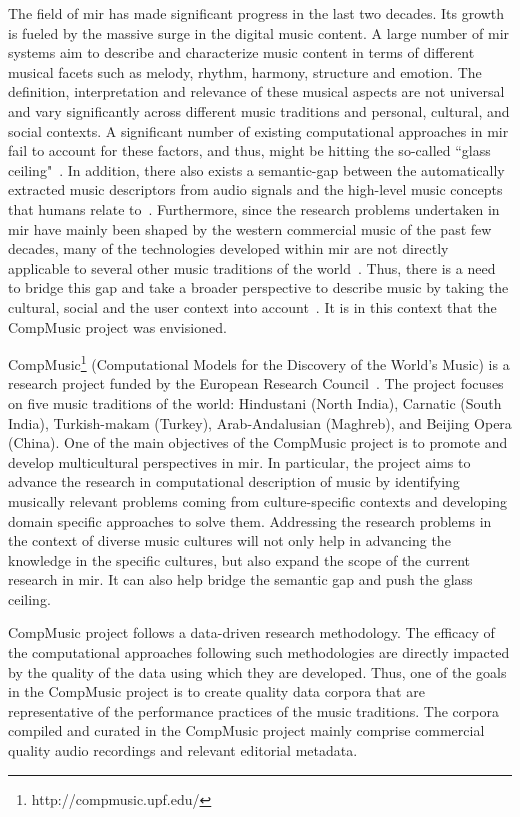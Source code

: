 The field of \gls{mir} has made significant progress in the last two decades. Its growth is fueled by the massive surge in the digital music content. A large number of \gls{mir} systems aim to describe and characterize music content in terms of different musical facets such as melody, rhythm, harmony, structure and emotion. The definition, interpretation and relevance of these musical aspects are not universal and vary significantly across different music traditions and personal, cultural, and social contexts. A significant number of existing computational approaches in \gls{mir} fail to account for these factors, and thus, might be hitting the so-called ``glass ceiling"~\citep{pachet2004improving,casey2008content}. In addition, there also exists a semantic-gap between the automatically extracted music descriptors from audio signals and the high-level music concepts that humans relate to~\citep{celma2006foafing,casey2008content}. Furthermore, since the research problems undertaken in \gls{mir} have mainly been shaped by the western commercial music of the past few decades, many of the technologies developed within \gls{mir} are not directly applicable to several other music traditions of the world~\citep{XavierSerra2011}.  Thus, there is a need to bridge this gap and take a broader perspective to describe music by taking the cultural, social and the user context into account~\citep{roadmap_mir}. It is in this context that the CompMusic project was envisioned.

CompMusic\footnote{http://compmusic.upf.edu/} (Computational Models for the Discovery of the World's Music) is a research project funded by the European Research Council~\citep{XavierSerra2011}. The project focuses on five music traditions of the world: Hindustani (North India), Carnatic (South India), Turkish-makam (Turkey), Arab-Andalusian (Maghreb), and Beijing Opera (China). One of the main objectives of the CompMusic project is to promote and develop multicultural perspectives in \gls{mir}. In particular, the project aims to advance the research in computational description of music by identifying musically relevant problems coming from culture-specific contexts and developing domain specific approaches to solve them. Addressing the research problems in the context of diverse music cultures will not only help in advancing the knowledge in the specific cultures, but also expand the scope of the current research in \gls{mir}. It can also help bridge the semantic gap and push the glass ceiling. 

CompMusic project follows a data-driven research methodology. The efficacy of the computational approaches following such methodologies are directly impacted by the quality of the data using which they are developed. Thus, one of the goals in the CompMusic project is to create quality data corpora that are representative of the performance practices of the music traditions. The corpora compiled and curated in the CompMusic project mainly comprise commercial quality audio recordings and relevant editorial metadata. 

